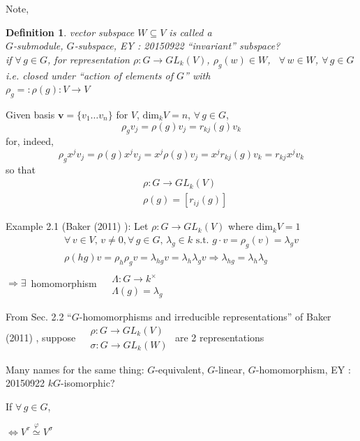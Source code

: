 \documentclass[10pt]{amsart}
\newtheorem{definition}{Definition}
\begin{document}
\begin{multicols*}{2}
Note, 
\begin{definition}
	vector subspace $W \subseteq V$ is called a \\
	$G$-submodule, $G$-subspace, EY : 20150922 ``invariant'' subspace? \\
	if $\forall \, g \in G$, for representation $\rho : G \to GL_k(V)$, $\rho_g(w) \in W$, \, $\forall \, w \in W$, $\forall \, g \in G$ i.e. closed under ``action of elements of $G$'' with \\
	$\rho_g =: \rho (g): V \to V$
\end{definition}

Given basis $\mathbf{v} = \lbrace v_1 \dots v_n \rbrace$ for $V$, $\text{dim}_kV = n$, $\forall \, g \in G$, 
\[
\rho_g v_j = \rho(g) v_j = r_{kj}(g) v_k
\]
for, indeed, 
\[
\rho_g x^j v_j = \rho(g) x^j v_j = x^j\rho(g) v_j = x^j r_{kj}(g) v_k = r_{kj} x^j v_k
\]
so that 
\[
\begin{aligned}
& \rho : G \to GL_k(V) \\ 
& \rho(g) = [r_{ij}(g)]
\end{aligned}
\]

Example 2.1 (Baker (2011) \cite{ABaker2011}): Let $\rho :G \to GL_k(V)$ where $\text{dim}_kV=1$
\[
\begin{gathered}
\forall \, v \in V, \, v\neq 0 , \forall \, g \in G, \, \lambda_g \in k \text{ s.t. } g \cdot v = \rho_g(v) = \lambda_g v \\ 
\rho(hg) v = \rho_h \rho_g v = \lambda_{hg} v = \lambda_h \lambda_g v \Longrightarrow \lambda_{hg} = \lambda_h \lambda_g
\end{gathered}
\]
$\Longrightarrow \exists \, $ homomorphism $\begin{aligned} & \quad \\
& \Lambda : G \to k^{\times } \\
& \Lambda(g) = \lambda_g \end{aligned}$


From Sec. 2.2 ``$G$-homomorphisms and irreducible representations'' of Baker (2011) \cite{ABaker2011}, suppose $\begin{aligned} & \rho : G \to GL_k(V) \\
& \sigma : G \to GL_k(W) \end{aligned}$ are 2 representations

Many names for the same thing: $G$-equivalent, $G$-linear, $G$-homomorphism, EY : 20150922 $kG$-isomorphic?

If $\forall \, g \in G$, 

  $\Longleftrightarrow  V^{\tau} \overset{\varphi}{\simeq} V^{\sigma}$


\end{multicols*}
\end{document}
